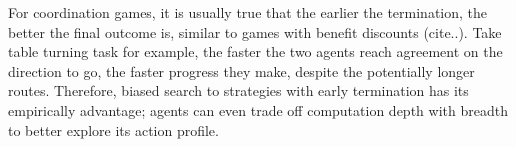 \documentclass[letterpaper, 10 pt, conference]{ieeeconf}  %
\newcommand{\argmax}{\arg\!\!\max}
\begin{document}
For coordination games, it is usually true that the earlier the termination, 
the better the final outcome is, similar to games with benefit discounts 
(cite..). Take table turning task for example, the faster the two agents 
reach agreement on the direction to go, the faster progress they make, despite 
the potentially longer routes. Therefore, biased search to 
strategies with early termination has its empirically advantage; agents 
can even trade off computation depth with breadth to better explore its action profile. 




\end{document}
